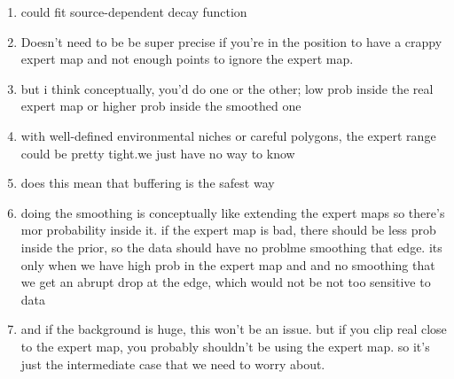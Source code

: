 \begin{enumerate}
  \item could fit source-dependent decay function
  \item Doesn't need to be be super precise if you're in the position to have a crappy expert map and not enough points to ignore the expert map.
  \item but i think conceptually, you'd do one or the other; low prob inside the real expert map or higher prob inside the smoothed one
  \item with well-defined environmental niches or careful polygons, the expert range could be pretty tight.we just have no way to know
  \item does this mean that buffering is the safest way
  \item doing the smoothing is conceptually like extending the expert maps so there's mor probability inside it. if the expert map is bad, there should be less prob inside the prior, so the data should have no problme smoothing that edge.
its only when we have high prob in the expert map and and no smoothing that we get an abrupt drop at the edge, which would not be  not too sensitive to data
  \item and if the background is huge, this won't be an issue. but if you clip real close to the expert map, you probably shouldn't be using the expert map. so it's just the intermediate case that we need to worry about.
\end{enumerate}

  